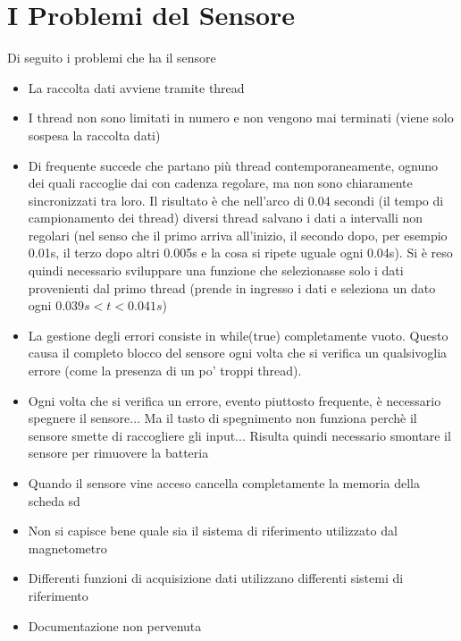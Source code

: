 \documentclass[12pt]{article}
\begin{document}
	\section*{I Problemi del Sensore}
	Di seguito i problemi che ha il sensore
	\begin{itemize}
		\item La raccolta dati avviene tramite thread
		\item I thread non sono limitati in numero e non vengono mai terminati (viene solo sospesa la raccolta dati)
		\item Di frequente succede che partano più thread contemporaneamente, ognuno dei quali raccoglie dai con cadenza regolare, ma non sono chiaramente sincronizzati tra loro. Il risultato è che nell'arco di 0.04 secondi (il tempo di campionamento dei thread) diversi thread salvano i dati a intervalli non regolari (nel senso che il primo arriva all'inizio, il secondo dopo, per esempio 0.01s, il terzo dopo altri 0.005s e la cosa si ripete uguale ogni 0.04s). Si è reso quindi necessario sviluppare una funzione che selezionasse solo i dati provenienti dal primo thread (prende in ingresso i dati e seleziona un dato ogni \(0.039s<t<0.041s\))
		\item La gestione degli errori consiste in while(true) completamente vuoto. Questo causa il completo blocco del sensore ogni volta che si verifica un qualsivoglia errore (come la presenza di un po' troppi thread).
		\item Ogni volta che si verifica un errore, evento piuttosto frequente, è necessario spegnere il sensore... Ma il tasto di spegnimento non funziona perchè il sensore smette di raccogliere gli input... Risulta quindi necessario smontare il sensore per rimuovere la batteria
		\item Quando il sensore vine acceso cancella completamente la memoria della scheda sd
		\item Non si capisce bene quale sia il sistema di riferimento utilizzato dal magnetometro
		\item Differenti funzioni di acquisizione dati utilizzano differenti sistemi di riferimento
		\item Documentazione non pervenuta
	\end{itemize}
\end{document}
